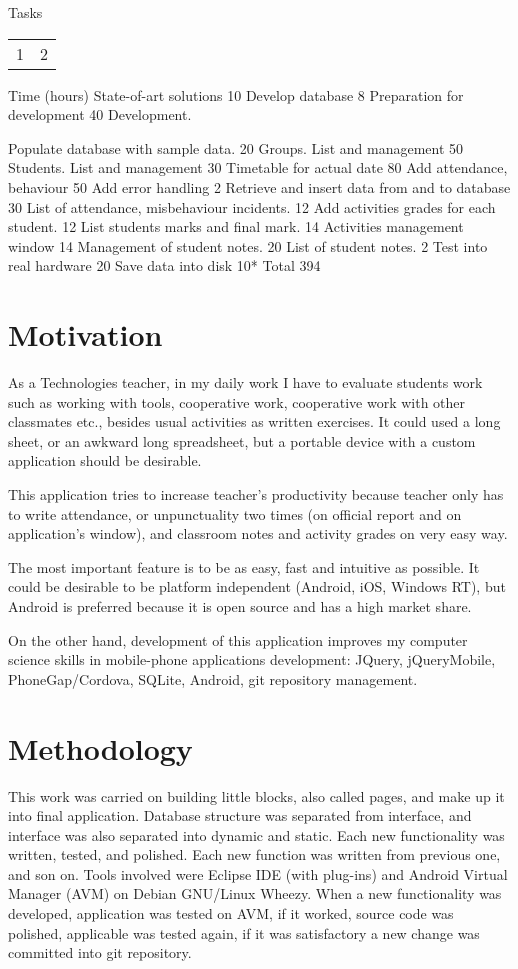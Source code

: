 Tasks
\begin{tabular} {c|c}
1 & 2  \\
\end{tabular}

Time  (hours)
State-of-art solutions
10
Develop database
8
Preparation for development
40
Development.

	Populate database with sample data.
20
	Groups. List and management
50
	Students. List and management
30
	Timetable for actual date
80
	Add attendance, behaviour
50
	Add error handling
2
	Retrieve and insert data from and to database
30
	List of attendance, misbehaviour incidents.
12
	Add activities grades for each student.
12
	List students marks and final mark.
14
	Activities management window 
14
	Management of student notes.
20
	List of student notes. 
2
Test into real hardware
20
Save data into disk
10*
Total
394

\section {Motivation}
  As a Technologies teacher, in my daily work I have to evaluate students work such as working with tools, cooperative work, cooperative work with other classmates etc., besides usual activities as written exercises. It could used a long sheet, or an awkward long spreadsheet, but a portable device with a custom application should be desirable.
  
	This application tries to increase teacher's productivity because teacher only has to write attendance, or unpunctuality two times (on official report and on application's window), and classroom notes and activity grades on very easy way.
	
	The most important feature is to be as easy, fast and intuitive as possible. It could be desirable to be platform independent (Android, iOS, Windows RT), but Android is preferred because it is open source and has a high market share.
	
	On the other hand, development of this application improves my computer science skills in  mobile-phone applications development: JQuery,  jQueryMobile, PhoneGap/Cordova, SQLite, Android,  git repository management.

\section {Methodology}

	This work was carried on building little blocks, also called pages, and make up it into final application. Database structure was separated from interface, and interface was also separated into dynamic and static. Each new functionality was written, tested, and polished. Each new function was written from previous one, and son on.
	Tools involved were Eclipse IDE (with plug-ins) and Android Virtual Manager (AVM) on Debian GNU/Linux Wheezy. When a new functionality was developed, application was tested on AVM,  if it worked, source code was polished, applicable was tested again, if it was satisfactory a new change was committed into git repository. 
